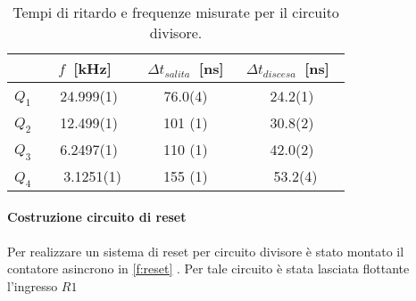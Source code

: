 \begin{table}[h]
	\centering
	\begin{tabular}{l S[table-figures-decimal=4, table-figures-uncertainty=1] S[table-figures-decimal=1, table-figures-integer=3, table-figures-uncertainty=1] S[table-figures-decimal=1, table-figures-uncertainty=1] }
		\toprule
			& {$f$ [\si{\kHz}]} & {$\Delta t_{salita}$ [\si{\ns}]} & {$\Delta t_{discesa}$ [\si{\ns}]} \\
		\midrule
		$Q_1$ & 24.999(1) & 76.0(4) & 24.2(1) \\
		$Q_2$ & 12.499(1) & 101 (1) & 30.8(2) \\
		$Q_3$ & 6.2497(1) & 110 (1) & 42.0(2) \\
		$Q_4$ & 3.1251(1) & 155 (1) & 53.2(4) \\
		\bottomrule
	\end{tabular}
	\caption{Tempi di ritardo e frequenze misurate per il circuito divisore.}
	\label{tab:divlag}
\end{table}

\paragraph{Costruzione circuito di reset}
Per realizzare un sistema di reset per circuito divisore
è stato montato il contatore asincrono in \figurename{  \ref{f:reset} }.
Per tale circuito è stata lasciata flottante l'ingresso $R1$
